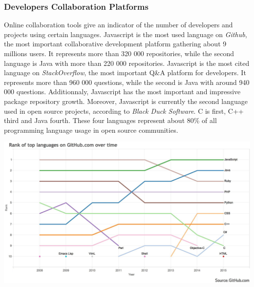 
\subsubsection{Developers Collaboration Platforms}

Online collaboration tools give an indicator of the number of developers and projects using certain languages.
Javascript is the most used language on \textit{Github}, the most important collaborative development platform gathering about 9 millions users.
It represents more than 320 000 repositories, while the second language is Java with more than 220 000 repositories.
Javascript is the most cited language on \textit{StackOverflow}, the most important Q\&A platform for developers.
It represents more than 960 000 questions, while the second is Java with around 940 000 questions.
Additionnaly, Javascript has the most important and impressive package repository growth.
Moreover, Javascript is currently the second language used in open source projects, according to \textit{Black Duck Software}.
C is first, C++ third and Java fourth.
These four languages represent about 80\% of all programming language usage in open source communities.

\includegraphics[width=0.9\linewidth]{../../data/js-trends/github-ranks}


